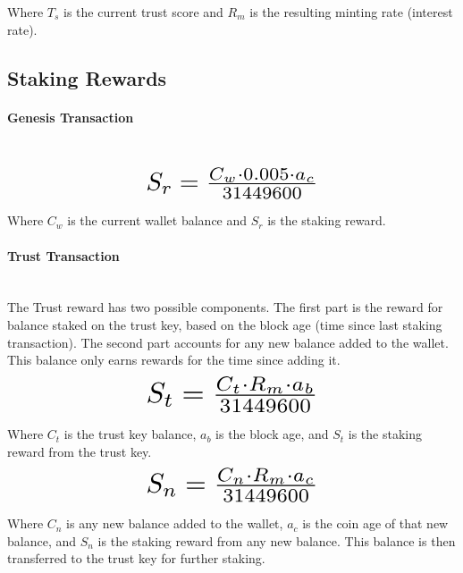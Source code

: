 \documentclass[11pt]{article}
\begin{document}
\noindent Where $T_{s}$ is the current trust score and $R_{m}$ is the resulting minting rate (interest rate).\\


\subsection{Staking Rewards}
\paragraph{Genesis Transaction} ~\\
\begin{equation}
\resizebox{.40\hsize}{!}{$S_{r} = \frac{C_{w} \cdot 0.005 \cdot a_c}{31449600}$}
\end{equation}

\noindent Where $C_{w}$ is the current wallet balance and $S_{r}$ is the staking reward.

\paragraph{Trust Transaction} ~\\
The Trust reward has two possible components. The first part is the reward for balance staked on the trust key, based on the block age (time since last staking transaction). The second part accounts for any new balance added to the wallet. This balance only earns rewards for the time since adding it.\\

\begin{equation}
\resizebox{.40\hsize}{!}{$S_{t} = \frac{C_{t} \cdot R_{m} \cdot a_{b}}{31449600}$}
\end{equation}

\noindent Where $C_{t}$ is the trust key balance, $a_{b}$ is the block age, and $S_{t}$ is the staking reward from the trust key.\\

\begin{equation}
\resizebox{.40\hsize}{!}{$S_{n} = \frac{C_{n} \cdot R_{m} \cdot a_c}{31449600}$}
\end{equation}

\noindent Where $C_{n}$ is any new balance added to the wallet, $a_c$ is the coin age of that new balance, and $S_{n}$ is the staking reward from any new balance. This balance is then transferred to the trust key for further staking.\\
\end{document}
